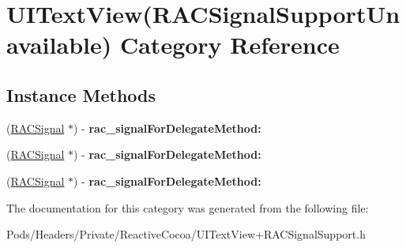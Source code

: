 \hypertarget{category_u_i_text_view_07_r_a_c_signal_support_unavailable_08}{}\section{U\+I\+Text\+View(R\+A\+C\+Signal\+Support\+Unavailable) Category Reference}
\label{category_u_i_text_view_07_r_a_c_signal_support_unavailable_08}
\subsection*{Instance Methods}
\begin{DoxyCompactItemize}
\item 
\mbox{\label{category_u_i_text_view_07_r_a_c_signal_support_unavailable_08_aaee6ea516e78279336cc5c871c7a6a9c}} 
(\mbox{\hyperlink{interface_r_a_c_signal}{R\+A\+C\+Signal}} $\ast$) -\/ {\bfseries rac\+\_\+signal\+For\+Delegate\+Method\+:}
\item 
\mbox{\label{category_u_i_text_view_07_r_a_c_signal_support_unavailable_08_aaee6ea516e78279336cc5c871c7a6a9c}} 
(\mbox{\hyperlink{interface_r_a_c_signal}{R\+A\+C\+Signal}} $\ast$) -\/ {\bfseries rac\+\_\+signal\+For\+Delegate\+Method\+:}
\item 
\mbox{\label{category_u_i_text_view_07_r_a_c_signal_support_unavailable_08_aaee6ea516e78279336cc5c871c7a6a9c}} 
(\mbox{\hyperlink{interface_r_a_c_signal}{R\+A\+C\+Signal}} $\ast$) -\/ {\bfseries rac\+\_\+signal\+For\+Delegate\+Method\+:}
\end{DoxyCompactItemize}


The documentation for this category was generated from the following file\+:\begin{DoxyCompactItemize}
\item 
Pods/\+Headers/\+Private/\+Reactive\+Cocoa/U\+I\+Text\+View+\+R\+A\+C\+Signal\+Support.\+h\end{DoxyCompactItemize}
